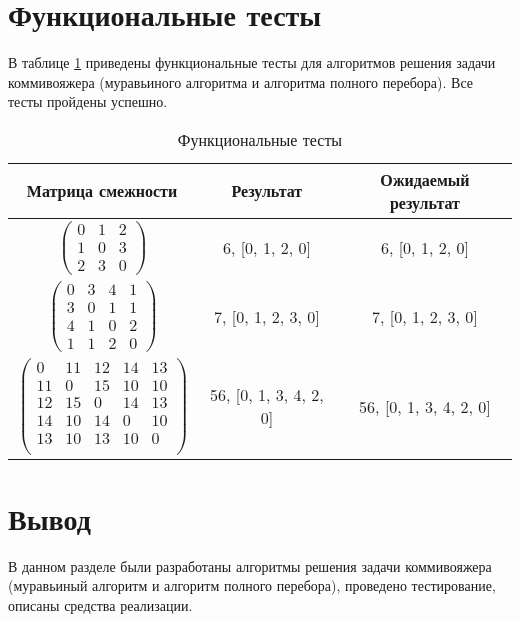\clearpage

\section{Функциональные тесты}

В таблице \ref{tbl:functional_test} приведены функциональные тесты для алгоритмов решения задачи коммивояжера (муравьиного алгоритма и алгоритма полного перебора). Все тесты пройдены успешно.

\begin{center}
\captionsetup{justification=raggedright,singlelinecheck=off}
\begin{longtable}[c]{|c|c|c|}
\caption{Функциональные тесты\label{tbl:functional_test}}
	\\ \hline
	Матрица смежности & Результат & Ожидаемый результат 
	\\ \hline
	$\begin{pmatrix}
		0 & 1 & 2\\
		1 & 0 & 3\\
		2 & 3 & 0
	\end{pmatrix}$ & 6, [0, 1, 2, 0] & 6, [0, 1, 2, 0]
	\\ \hline
	$\begin{pmatrix}
		0 & 3 & 4 & 1\\
		3 & 0 & 1 & 1\\
		4 & 1 & 0 & 2\\
		1 & 1 & 2 & 0
	\end{pmatrix}$ & 7, [0, 1, 2, 3, 0] & 7, [0, 1, 2, 3, 0]
	\\ \hline
	$\begin{pmatrix}
		0 & 11 & 12 & 14 & 13\\
		11 & 0 & 15 & 10 & 10\\
		12 & 15 & 0 & 14 & 13\\
		14 & 10 & 14 & 0 & 10\\
		13 & 10 & 13 & 10 & 0\\
	\end{pmatrix}$ & 56, [0, 1, 3, 4, 2, 0] & 56, [0, 1, 3, 4, 2, 0]
	\\ \hline

\end{longtable}
\end{center}


\section{Вывод}

В данном разделе были разработаны алгоритмы решения задачи коммивояжера (муравьиный алгоритм и алгоритм полного перебора), проведено тестирование, описаны средства реализации.



